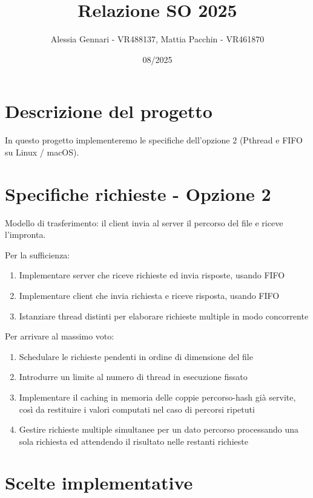 \documentclass[a4paper, titlepage, 12pt]{article}
\title{Relazione SO 2025}
\author{Alessia Gennari - VR488137, Mattia Pacchin - VR461870}
\date{08/2025}
\begin{document}
\maketitle
\tableofcontents

\section{Descrizione del progetto}

In questo progetto implementeremo le specifiche dell'opzione 2 (Pthread e FIFO su Linux / macOS).

\section{Specifiche richieste - Opzione 2}

Modello di trasferimento: il client invia al server il percorso del file e riceve l'impronta.

Per la sufficienza:
\begin{enumerate}
    \item Implementare server che riceve richieste ed invia risposte, usando FIFO
    \item Implementare client che invia richiesta e riceve risposta, usando FIFO
    \item Istanziare thread distinti per elaborare richieste multiple in modo concorrente
\end{enumerate}

Per arrivare al massimo voto:
\begin{enumerate}
    \item Schedulare le richieste pendenti in ordine di dimensione del file
    \item Introdurre un limite al numero di thread in esecuzione fissato
    \item Implementare il caching in memoria delle coppie percorso-hash già servite, così da restituire i valori computati nel caso di percorsi ripetuti
    \item Gestire richieste multiple simultanee per un dato percorso processando una sola richiesta ed attendendo il risultato nelle restanti richieste
\end{enumerate}

\section{Scelte implementative}

\end{document}
